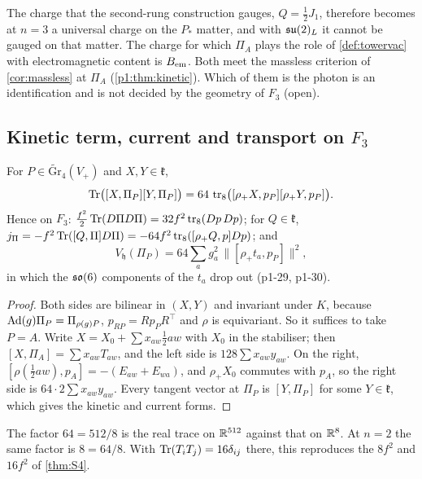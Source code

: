 The charge that the second-rung construction gauges, $Q=\tfrac12J_1$, therefore becomes at $n=3$ a universal charge on the
$P_*$ matter, and with $\mathfrak{su}(2)_L$ it cannot be gauged on that matter. The charge for which $\Pi_A$ plays the role of \cref{def:towervac} with electromagnetic content is
$B_{\rm em}$. Both meet the massless criterion of \cref{cor:massless} at $\Pi_A$ (\cref{p1:thm:kinetic}). Which of them is the photon is an identification and is
not decided by the geometry of $F_3$ (open).

\subsection{Kinetic term, current and transport on \texorpdfstring{$F_3$}{F\_3}}
\label{p1:sec:kinetic}

\begin{lemma}
\label{p1:lem:vector}
For $P\in\widetilde{\mathrm{Gr}}_4(V_+)$ and $X,Y\in\mathfrak k$,
\[
\operatorname{Tr}\bigl([X,\Pi_P][Y,\Pi_P]\bigr)=64\,\operatorname{tr}_8\bigl([\rho_+X,p_P][\rho_+Y,p_P]\bigr).
\]
Hence on $F_3$: $\tfrac{f^2}2\operatorname{Tr}(D\Pi D\Pi)=32f^2\operatorname{tr}_8(Dp\,Dp)$; for $Q\in\mathfrak k$, $j_\Pi=-f^2\operatorname{Tr}([Q,\Pi]D\Pi)=-64f^2\operatorname{tr}_8([\rho_+Q,p]Dp)$; and
\[
V_{\mathfrak h}(\Pi_P)=64\sum_ag_a^2\,\|[\rho_+t_a,p_P]\|^2 ,
\]
in which the $\mathfrak{so}(6)$ components of the $t_a$ drop out (p1-29, p1-30).
\end{lemma}

\begin{proof}
Both sides are bilinear in $(X,Y)$ and invariant under $K$, because $\operatorname{Ad}(g)\Pi_P=\Pi_{\rho(g)P}$, $p_{RP}=Rp_PR^{\!\top}$ and $\rho$ is equivariant. So it suffices to take
$P=A$. Write $X=X_0+\sum x_{aw}\tfrac12aw$ with $X_0$ in the stabiliser; then $[X,\Pi_A]=\sum x_{aw}T_{aw}$, and the left side is $128\sum x_{aw}y_{aw}$. On the right,
$[\rho(\tfrac12aw),p_A]=-(E_{aw}+E_{wa})$, and $\rho_+X_0$ commutes with $p_A$, so the right side is $64\cdot2\sum x_{aw}y_{aw}$. Every tangent vector at $\Pi_P$ is $[Y,\Pi_P]$ for
some $Y\in\mathfrak k$, which gives the kinetic and current forms.
\end{proof}

The factor $64=512/8$ is the real trace on $\mathbb{R}^{512}$ against that on $\mathbb{R}^8$. At $n=2$ the same factor is $8=64/8$. With $\operatorname{Tr}(T_iT_j)=16\delta_{ij}$ there, this reproduces
the $8f^2$ and $16f^2$ of \cref{thm:S4}.

